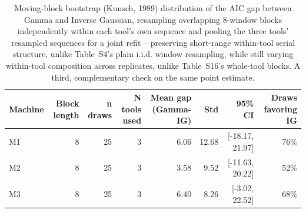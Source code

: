 \begin{table}[t]
\centering
\caption{Moving-block bootstrap (Kunsch, 1989) distribution of the AIC gap between Gamma and Inverse Gaussian, resampling overlapping 8-window blocks independently within each tool's own sequence and pooling the three tools' resampled sequences for a joint refit -- preserving short-range within-tool serial structure, unlike Table~S4's plain i.i.d. window resampling, while still varying within-tool composition across replicates, unlike Table~S16's whole-tool blocks. A third, complementary check on the same point estimate.}
\label{tab:moving-block-bootstrap-aic-gap}
\begin{tabular}{lrrrrrrr}
\toprule
Machine & Block length & n draws & N tools used & Mean gap (Gamma-IG) & Std & 95\% CI & Draws favoring IG \\
\midrule
M1 & 8 & 25 & 3 & 6.06 & 12.68 & [-18.17, 21.97] & 76\% \\
M2 & 8 & 25 & 3 & 3.58 & 9.52 & [-11.63, 20.22] & 52\% \\
M3 & 8 & 25 & 3 & 6.40 & 8.26 & [-3.02, 22.52] & 68\% \\
\bottomrule
\end{tabular}
\end{table}
